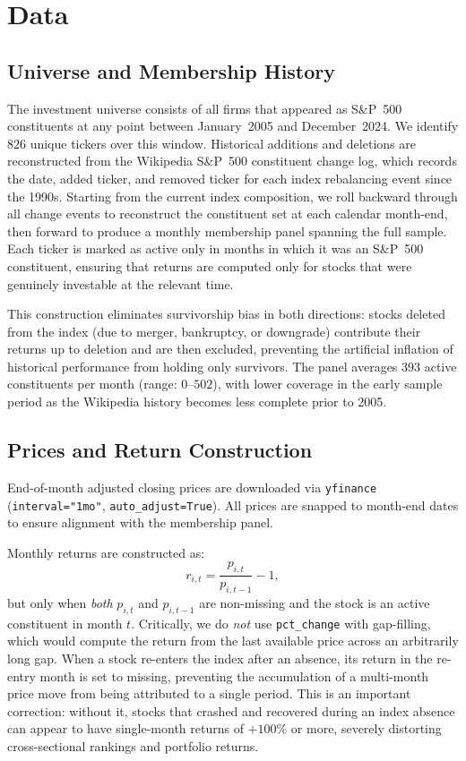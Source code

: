 \documentclass[11pt]{article}
\begin{document}
\section{Data}
\label{sec:data}

\subsection{Universe and Membership History}

The investment universe consists of all firms that appeared as S\&P~500 constituents
at any point between January~2005 and December~2024. We identify $826$ unique tickers
over this window. Historical additions and deletions are reconstructed from the Wikipedia
S\&P~500 constituent change log, which records the date, added ticker, and removed ticker
for each index rebalancing event since the 1990s. Starting from the current index
composition, we roll backward through all change events to reconstruct the constituent
set at each calendar month-end, then forward to produce a monthly membership panel
spanning the full sample. Each ticker is marked as active only in months in which it
was an S\&P~500 constituent, ensuring that returns are computed only for stocks that
were genuinely investable at the relevant time.

This construction eliminates survivorship bias in both directions: stocks deleted from
the index (due to merger, bankruptcy, or downgrade) contribute their returns up to
deletion and are then excluded, preventing the artificial inflation of historical
performance from holding only survivors. The panel averages $393$ active constituents
per month (range: $0$--$502$), with lower coverage in the early sample period as the
Wikipedia history becomes less complete prior to 2005.

\subsection{Prices and Return Construction}

End-of-month adjusted closing prices are downloaded via \texttt{yfinance}
(\texttt{interval="1mo"}, \texttt{auto\_adjust=True}). All prices are snapped to
month-end dates to ensure alignment with the membership panel.

Monthly returns are constructed as:
\[
  r_{i,t} = \frac{p_{i,t}}{p_{i,t-1}} - 1,
\]
but only when \emph{both} $p_{i,t}$ and $p_{i,t-1}$ are non-missing and the stock is
an active constituent in month $t$. Critically, we do \emph{not} use \texttt{pct\_change}
with gap-filling, which would compute the return from the last available price across
an arbitrarily long gap. When a stock re-enters the index after an absence, its return
in the re-entry month is set to missing, preventing the accumulation of a multi-month
price move from being attributed to a single period. This is an important correction:
without it, stocks that crashed and recovered during an index absence can appear to have
single-month returns of $+100\%$ or more, severely distorting cross-sectional rankings
and portfolio returns.
\end{document}
